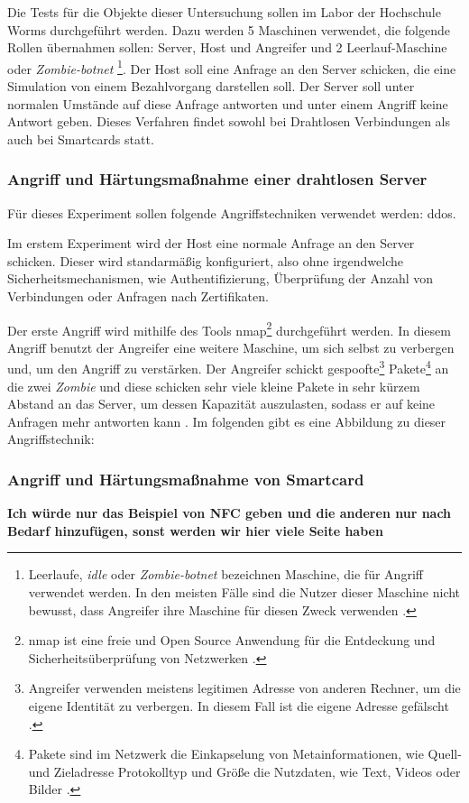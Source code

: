 Die Tests für die Objekte dieser Untersuchung sollen im Labor der Hochschule Worms durchgeführt werden. 
Dazu werden 5 Maschinen verwendet, die folgende Rollen übernahmen sollen: Server, Host und Angreifer und 2
Leerlauf-Maschine oder \textit{Zombie-botnet} \footnote{Leerlaufe, \textit{idle} oder \textit{Zombie-botnet} 
bezeichnen Maschine, die für Angriff verwendet werden. In den meisten Fälle sind die Nutzer dieser Maschine nicht
bewusst, dass Angreifer ihre Maschine für diesen Zweck verwenden \cite{refart:XGDD}.}. Der Host soll eine 
Anfrage an den Server schicken, die eine Simulation von einem Bezahlvorgang darstellen soll. Der Server 
soll unter normalen Umstände auf diese Anfrage antworten und unter einem Angriff keine Antwort geben.
Dieses Verfahren findet sowohl bei Drahtlosen Verbindungen als auch bei Smartcards statt.


\subsubsection{Angriff und Härtungsmaßnahme einer drahtlosen Server}
Für dieses Experiment sollen folgende Angriffstechniken verwendet werden: ddos.

Im erstem Experiment wird der Host eine normale Anfrage an den Server schicken. Dieser wird standarmäßig konfiguriert,
also ohne irgendwelche Sicherheitsmechanismen, wie Authentifizierung, Überprüfung der Anzahl von Verbindungen oder Anfragen
nach Zertifikaten.

Der erste Angriff wird mithilfe des Tools nmap\footnote{nmap ist eine freie und Open 
Source Anwendung für die Entdeckung und Sicherheitsüberprüfung von Netzwerken \cite{refst:nmap}.} durchgeführt
werden. In diesem Angriff benutzt der Angreifer eine weitere Maschine, um sich selbst zu verbergen und, um den 
Angriff zu verstärken. Der Angreifer schickt gespoofte\footnote{Angreifer verwenden meistens legitimen Adresse 
von anderen Rechner, um die eigene Identität zu verbergen. In diesem Fall ist die eigene Adresse gefälscht 
\cite{refst:IPIO}.} Pakete\footnote{Pakete sind im Netzwerk die Einkapselung von Metainformationen, wie Quell-
und Zieladresse Protokolltyp und Größe die Nutzdaten, wie Text, Videos oder Bilder \cite{refbook:SWIS}.} an 
die zwei \textit{Zombie} und diese schicken sehr viele kleine Pakete in sehr kürzem Abstand an das Server, 
um dessen Kapazität auszulasten, sodass er auf keine Anfragen mehr antworten kann \cite{refip:KSDD}. Im 
folgenden gibt es eine Abbildung zu dieser Angriffstechnik:


\subsubsection{Angriff und Härtungsmaßnahme von Smartcard}
\textbf{Ich würde nur das Beispiel von NFC geben und die anderen nur nach Bedarf hinzufügen, sonst werden wir hier
viele Seite haben}


